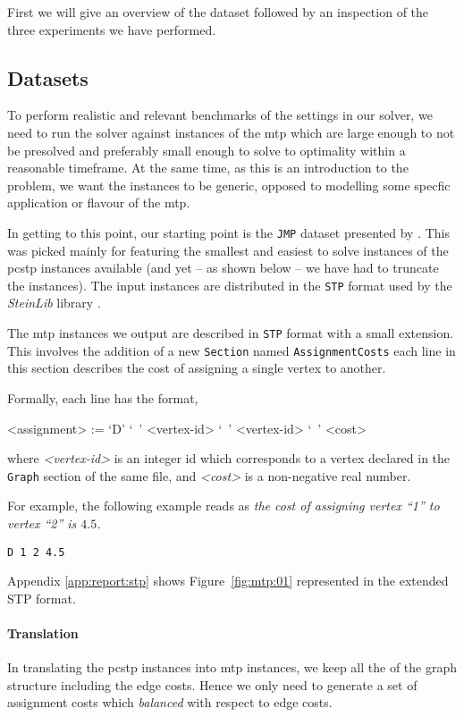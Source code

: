 First we will give an overview of the dataset followed by an inspection of the three experiments we have
 performed.
 \subsection{Datasets}
 To perform realistic and relevant benchmarks of the settings in our solver, we need to run the solver
 against instances of the \gls{mtp} which are large enough to not be presolved and preferably small
 enough to solve to optimality within a reasonable timeframe. At the same time, as this is an introduction
 to the problem, we want the instances to be generic, opposed to modelling some specfic application or
 flavour of the \gls{mtp}.

 In getting to this point, our starting point is the \texttt{JMP} dataset presented by 
 \citet{Johnson:2000:PCS:338219.338637}. This was picked mainly for featuring the smallest
 and easiest to solve instances of the \gls{pcstp} instances available
 (and yet -- as shown below -- we have had to truncate the instances).
 The input instances are distributed in the \texttt{STP} format used by the \textit{SteinLib}
 library \citep{koch2001steinlib}.

 The \gls{mtp} instances we output are described in \texttt{STP} format with a small extension.
 This involves the addition of a new \texttt{Section} named \texttt{AssignmentCosts} each line
 in this section describes the cost of assigning a single vertex to another.

 Formally, each line has the format,
 \begin{grammar}
   <assignment> := `D' `\ ' <vertex-id> `\ ' <vertex-id> `\ ' <cost>
 \end{grammar}
 where \textit{<vertex-id>} is an integer id which corresponds to a vertex declared in the \texttt{Graph}
 section of the same file, and \textit{<cost>} is a non-negative real number.

 For example, the following example reads as \textit{the cost of assigning vertex ``1'' to vertex ``2'' is $4.5$.}
\begin{verbatim}
D 1 2 4.5
\end{verbatim}
Appendix \ref{app:report:stp} shows Figure~\ref{fig:mtp:01} represented in the extended STP format.
 \paragraph{Translation}
 In translating the \gls{pcstp} instances into \gls{mtp} instances, we keep all the of the graph
 structure including the edge costs. Hence we only need to generate a set of assignment costs which
  \textit{balanced} with respect to edge costs.

